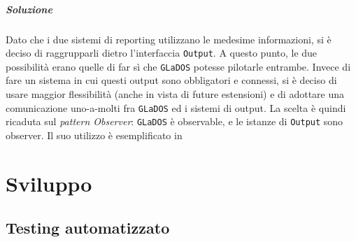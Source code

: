 \documentclass[a4paper,12pt]{report}
\begin{document}
\paragraph{Soluzione} Dato che i due sistemi di reporting utilizzano le medesime informazioni, si è deciso di raggrupparli dietro l'interfaccia \texttt{Output}.
A questo punto, le due possibilità erano quelle di far sì che \texttt{GLaDOS} potesse pilotarle entrambe.
Invece di fare un sistema in cui questi output sono obbligatori e connessi, si è deciso di usare maggior flessibilità (anche in vista di future estensioni)
e di adottare una comunicazione uno-a-molti fra \texttt{GLaDOS} ed i sistemi di output.
La scelta è quindi ricaduta sul \textit{pattern Observer}: \texttt{GLaDOS} è observable, e le istanze di \texttt{Output} sono observer.
%
Il suo utilizzo è esemplificato in 

\chapter{Sviluppo}
\section{Testing automatizzato}
\end{document}
